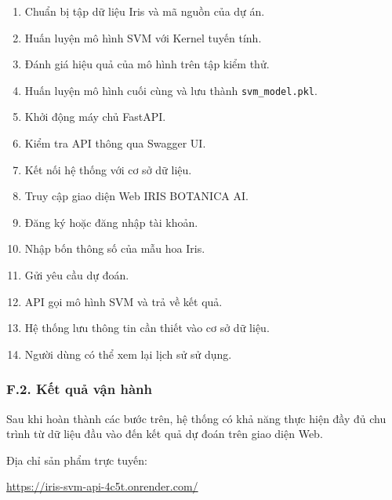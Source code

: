 \documentclass[14pt]{extarticle}
\begin{document}
	\begin{enumerate}[leftmargin=*]
		
		\item Chuẩn bị tập dữ liệu Iris và mã nguồn của dự án.
		
		\item Huấn luyện mô hình SVM với Kernel tuyến tính.
		
		\item Đánh giá hiệu quả của mô hình trên tập kiểm thử.
		
		\item Huấn luyện mô hình cuối cùng và lưu thành
		\texttt{svm\_model.pkl}.
		
		\item Khởi động máy chủ FastAPI.
		
		\item Kiểm tra API thông qua Swagger UI.
		
		\item Kết nối hệ thống với cơ sở dữ liệu.
		
		\item Truy cập giao diện Web IRIS BOTANICA AI.
		
		\item Đăng ký hoặc đăng nhập tài khoản.
		
		\item Nhập bốn thông số của mẫu hoa Iris.
		
		\item Gửi yêu cầu dự đoán.
		
		\item API gọi mô hình SVM và trả về kết quả.
		
		\item Hệ thống lưu thông tin cần thiết vào cơ sở dữ liệu.
		
		\item Người dùng có thể xem lại lịch sử sử dụng.
		
	\end{enumerate}
	
	\subsubsection*{F.2. Kết quả vận hành}
	
	\noindent
	Sau khi hoàn thành các bước trên, hệ thống có khả năng thực hiện đầy đủ
	chu trình từ dữ liệu đầu vào đến kết quả dự đoán trên giao diện Web.
	

	\noindent
	Địa chỉ sản phẩm trực tuyến:
	
	\begin{center}
		\url{https://iris-svm-api-4c5t.onrender.com/}
	\end{center}
	
\end{document}
